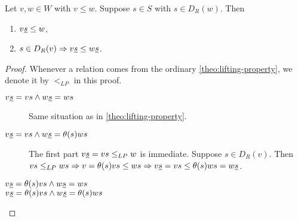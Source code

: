\begin{lemm}
	Let $v,w \in W$ with $v \leq w$. Suppose $s \in S$ with $s \in D_R(w)$. Then
	\begin{enumerate}
		\item $v \underline{s} \leq w$,
		\item $s \in D_R(v) \Rightarrow v \underline{s} \leq w \underline{s}$.
	\end{enumerate}

	\begin{proof}
		Whenever a relation comes from the ordinary \ref{theo:lifting-property}, we denote it by $<_{LP}$ in this proof.
		\begin{description}
			\item[$v \underline{s} = vs \wedge w \underline{s} = ws$] Same situation as in \ref{theo:lifting-property}.
			\item[$v \underline{s} = vs \wedge w \underline{s} = \theta(s)ws$] The first part $v \underline{s} = vs \leq_{LP} w$ is immediate. Suppose $s \in D_R(v)$. Then $vs \leq_{LP} ws \Rightarrow v = \theta(s)vs \leq ws \Rightarrow v \underline{s} = vs \leq \theta(s)ws = w \underline{s}$. 
			\item[$v \underline{s} = \theta(s)vs \wedge w \underline{s} = ws$] \todo
			\item[$v \underline{s} = \theta(s)vs \wedge w \underline{s} = \theta(s)ws$] \todo \qedhere
		\end{description}
	\end{proof}
\end{lemm}

\begin{prop}
	\todo
\end{prop}

\begin{prop}
	\todo
\end{prop}

\todo